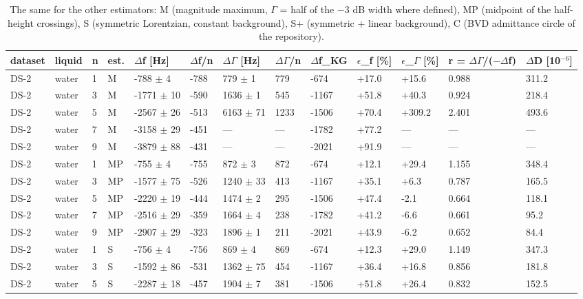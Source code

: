 \documentclass[11pt,a4paper]{article}
\begin{document}
\begin{landscape}{\scriptsize\setlength{\tabcolsep}{2pt}
\begin{longtable}{@{}lllllllllllll@{}}
\caption{The same for the other estimators: M (magnitude maximum, $\Gamma$ = half of the $-$3 dB width where defined), MP (midpoint of the half-height crossings), S (symmetric Lorentzian, constant background), S+ (symmetric + linear background), C (BVD admittance circle of the repository).}\\
\toprule
dataset & liquid & n & est. & $\Delta$f [Hz] & $\Delta$f/n & $\Delta$$\Gamma$ [Hz] & $\Delta$$\Gamma$/n & $\Delta$f\_KG & $\epsilon$\_f [\%] & $\epsilon$\_$\Gamma$ [\%] & r = $\Delta$$\Gamma$/($-$$\Delta$f) & $\Delta$D [10$^{-6}$] \\\midrule\endhead
DS-2 & water & 1 & M & -788 $\pm$ 4 & -788 & 779 $\pm$ 1 & 779 & -674 & +17.0 & +15.6 & 0.988 & 311.2 \\
DS-2 & water & 3 & M & -1771 $\pm$ 10 & -590 & 1636 $\pm$ 1 & 545 & -1167 & +51.8 & +40.3 & 0.924 & 218.4 \\
DS-2 & water & 5 & M & -2567 $\pm$ 26 & -513 & 6163 $\pm$ 71 & 1233 & -1506 & +70.4 & +309.2 & 2.401 & 493.6 \\
DS-2 & water & 7 & M & -3158 $\pm$ 29 & -451 & --- & --- & -1782 & +77.2 & --- & --- & --- \\
DS-2 & water & 9 & M & -3879 $\pm$ 88 & -431 & --- & --- & -2021 & +91.9 & --- & --- & --- \\
DS-2 & water & 1 & MP & -755 $\pm$ 4 & -755 & 872 $\pm$ 3 & 872 & -674 & +12.1 & +29.4 & 1.155 & 348.4 \\
DS-2 & water & 3 & MP & -1577 $\pm$ 75 & -526 & 1240 $\pm$ 33 & 413 & -1167 & +35.1 & +6.3 & 0.787 & 165.5 \\
DS-2 & water & 5 & MP & -2220 $\pm$ 19 & -444 & 1474 $\pm$ 2 & 295 & -1506 & +47.4 & -2.1 & 0.664 & 118.1 \\
DS-2 & water & 7 & MP & -2516 $\pm$ 29 & -359 & 1664 $\pm$ 4 & 238 & -1782 & +41.2 & -6.6 & 0.661 & 95.2 \\
DS-2 & water & 9 & MP & -2907 $\pm$ 29 & -323 & 1896 $\pm$ 1 & 211 & -2021 & +43.9 & -6.2 & 0.652 & 84.4 \\
DS-2 & water & 1 & S & -756 $\pm$ 4 & -756 & 869 $\pm$ 4 & 869 & -674 & +12.3 & +29.0 & 1.149 & 347.3 \\
DS-2 & water & 3 & S & -1592 $\pm$ 86 & -531 & 1362 $\pm$ 75 & 454 & -1167 & +36.4 & +16.8 & 0.856 & 181.8 \\
DS-2 & water & 5 & S & -2287 $\pm$ 18 & -457 & 1904 $\pm$ 7 & 381 & -1506 & +51.8 & +26.4 & 0.832 & 152.5 \\

\end{longtable}}
\end{landscape}
\end{document}
